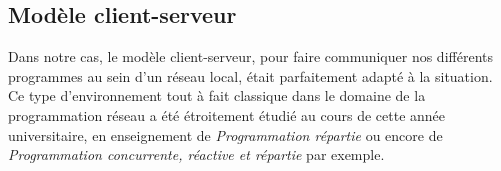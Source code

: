 \subsection{Modèle client-serveur}

Dans notre cas, le modèle client-serveur, pour faire communiquer nos différents programmes au sein d'un réseau local, était parfaitement adapté à la situation. Ce type d'environnement tout à fait classique dans le domaine de la programmation réseau a été étroitement étudié au cours de cette année universitaire, en enseignement de \textit{Programmation répartie} ou encore de \textit{Programmation concurrente, réactive et répartie} par exemple.